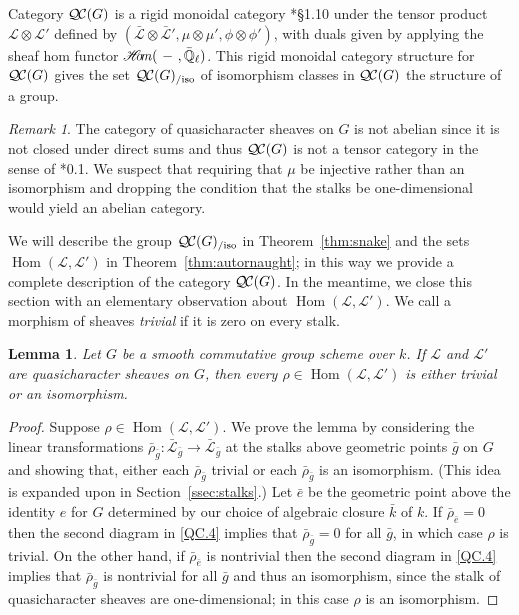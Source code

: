 \documentclass[CM,Submssn,SecEq]{degruyter-crelle} %
\theoremstyle{plain}
\newtheorem{lemma}[theorem]{Lemma}
\theoremstyle{definition}
\theoremstyle{remark}
\newtheorem{remark}[theorem]{Remark}
\newcommand{\EE}{\mathbb{\bar Q}_\ell}
\newcommand{\bFq}{\bar{k}}
\newcommand{\Fq}{k}
\DeclareMathOperator{\Hom}{Hom}
\newcommand{\sheafHom}{{\mathscr{H}\hskip-4pt{\it o}\hskip-2pt{\it m}}}
\newcommand{\qcs}[1]{{\mathcal{#1}}}
\newcommand{\gqcs}[1]{{\mathcal{\bar #1}}}
\newcommand{\QC}{{\mathcal{Q\hskip-0.8pt C}}}
\newcommand{\QCiso}[1]{\QC(#1)_{/\text{iso}}}
\newcommand{\brho}{{\bar\rho}}
\begin{document}
Category $\QC(G)$ is a rigid monoidal category
\cite{etingof:09a}*{\S1.10} under the tensor product
$\qcs{L} \otimes \qcs{L'}$ defined by $(\gqcs{L}\otimes\gqcs{L'}, \mu\otimes\mu', \phi\otimes \phi')$,
with duals given by applying the sheaf hom functor
$\sheafHom(\ - \ ,\EE)$.
This rigid monoidal category structure for $\QC(G)$ gives the set $\QCiso{G}$
of isomorphism classes in $\QC(G)$ the structure of a group.

\begin{remark}
The category of quasicharacter sheaves on $G$ is not abelian since it is not closed under direct sums and thus $\QC(G)$
is not a tensor category in the sense of \cite{deligne:02a}*{0.1}.  We suspect that requiring that $\mu$ be injective rather than
an isomorphism and dropping the condition that the stalks be one-dimensional would yield an abelian category.
\end{remark}

We will describe the group $\QCiso{G}$ in Theorem~\ref{thm:snake}
and the sets $\Hom(\qcs{L},\qcs{L}')$ in Theorem~\ref{thm:autornaught}; in this way we provide a complete description of the category $\QC(G)$.
%
In the meantime, we close this section with an elementary observation about $\Hom(\qcs{L},\qcs{L}')$.
We call a morphism of sheaves \emph{trivial} if it is zero on every stalk.

\begin{lemma}\label{lem:autornaught}
Let $G$ be a smooth commutative group scheme over $\Fq$.
If $\qcs{L}$ and $\qcs{L}'$ are quasicharacter sheaves on $G$, then
every $\rho\in \Hom(\qcs{L},\qcs{L}')$ is either trivial or an isomorphism. 
\end{lemma}

\begin{proof}
Suppose $\rho \in \Hom(\qcs{L},\qcs{L}')$.
We prove the lemma by considering the linear transformations $\brho_{\bar g} : \gqcs{L}_{\bar g} \to \gqcs{L}_{\bar g}$ at the stalks above geometric points ${\bar g}$ on $G$ and showing that, either each $\brho_{\bar g}$ trivial or each $\brho_{\bar g}$ is an isomorphism.
(This idea is expanded upon in Section~\ref{ssec:stalks}.)
Let ${\bar e}$ be the geometric point above the identity $e$ for $G$ determined by our choice of algebraic closure $\bFq$ of $\Fq$.
If $\brho_{\bar e} = 0$ then the second diagram in \ref{QC.4} implies that $\brho_{\bar g} = 0$ for all ${\bar g}$, in which case $\rho$ is trivial.
On the other hand, if $\brho_{\bar e}$ is nontrivial then the second diagram in \ref{QC.4}  implies that $\brho_{\bar g}$ is nontrivial for all ${\bar g}$ and thus an isomorphism, since the stalk of quasicharacter sheaves are one-dimensional; in this case $\rho$ is an isomorphism.
\end{proof}
\end{document}
